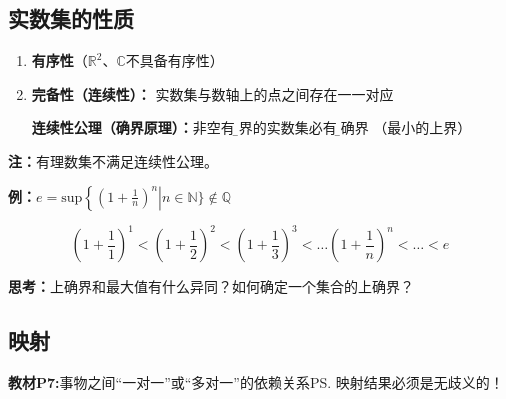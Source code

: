 \subsection{实数集的性质}
	\begin{enumerate} 
	  \item {\bf 有序性}（$\mathbb{R}^2$、$\mathbb{C}$不具备有序性） 
	  \item {\bf 完备性（连续性）： }实数集与数轴上的点之间存在一一对应
	  
	  {\bf{连续性公理（确界原理）：}}非空有{\b 上界}的实数集必有{\b 上确界} （最小的上界）
	\end{enumerate}
	
	{\bf 注：}有理数集不满足连续性公理。
	
	{\bf 例：$e=\mathrm{sup}\left\{\left(1+\frac
	1n\right)^n\right|n\in\mathbb{N}\}\notin\mathbb{Q}$}
	\begin{center}
	\end{center}
	$$\left(1+\frac11\right)^1<\left(1+\frac12\right)^2<\left(1+\frac13\right)^3<\ldots
	\left(1+\frac1n\right)^n<\ldots<e$$
	
	{\bf 思考：}上确界和最大值有什么异同？如何确定一个集合的上确界？

\subsection{映射}

{\bf 教材P7:}事物之间“一对一”或“多对一”的依赖关系\ps{映射结果必须是无歧义的！}

